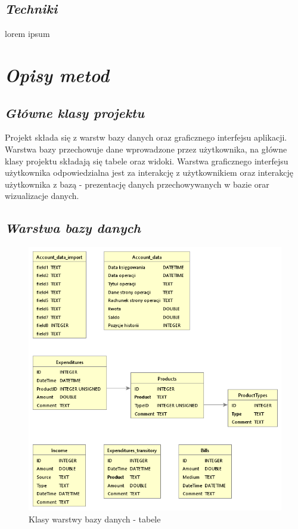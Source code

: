 \documentclass[a4paper,10pt]{report}
\newcommand{\customstylechapter}[1]{\large{\textit{#1}}}
\newcommand{\customstylesection}[1]{\textbf{\textit{#1}}}
\begin{document}
\section{\customstylesection{Techniki}}
{lorem ipsum}

\chapter{\customstylechapter{Opisy metod}}
\section{\customstylesection{Główne klasy projektu}}
{Projekt składa się z warstw bazy danych oraz graficznego interfejsu aplikacji. 
Warstwa bazy przechowuje dane wprowadzone przez użytkownika, na główne klasy 
projektu składają się tabele oraz widoki. Warstwa graficznego interfejsu 
użytkownika odpowiedzialna jest za interakcję z użytkownikiem oraz interakcję
 użytkownika z bazą - prezentację danych przechowywanych w bazie orar 
 wizualizacje danych.}

\section{\customstylesection{Warstwa bazy danych}}

\begin{figure}[H]           %
    \caption{Klasy warstwy bazy danych - tabele}
    \label{fig:Klasy warstwy bazy danych - tabele}
    \centering  
    \includegraphics[width=12cm]{figures/Budgeter_Finances-db_Tables.png}
\end{figure}
\end{document}
